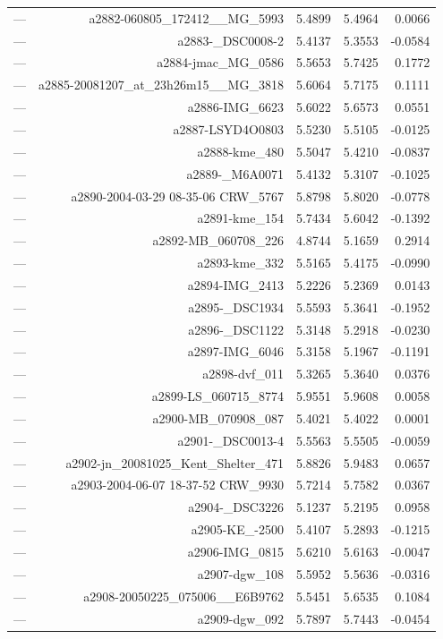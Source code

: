 \begin{table}[htbp]
\begin{tabular}{lrrrr}
— & a2882-060805_172412__MG_5993 & 5.4899 & 5.4964 & 0.0066 \\
— & a2883-_DSC0008-2 & 5.4137 & 5.3553 & -0.0584 \\
— & a2884-jmac_MG_0586 & 5.5653 & 5.7425 & 0.1772 \\
— & a2885-20081207_at_23h26m15__MG_3818 & 5.6064 & 5.7175 & 0.1111 \\
— & a2886-IMG_6623 & 5.6022 & 5.6573 & 0.0551 \\
— & a2887-LSYD4O0803 & 5.5230 & 5.5105 & -0.0125 \\
— & a2888-kme_480 & 5.5047 & 5.4210 & -0.0837 \\
— & a2889-_M6A0071 & 5.4132 & 5.3107 & -0.1025 \\
— & a2890-2004-03-29 08-35-06 CRW_5767 & 5.8798 & 5.8020 & -0.0778 \\
— & a2891-kme_154 & 5.7434 & 5.6042 & -0.1392 \\
— & a2892-MB_060708_226 & 4.8744 & 5.1659 & 0.2914 \\
— & a2893-kme_332 & 5.5165 & 5.4175 & -0.0990 \\
— & a2894-IMG_2413 & 5.2226 & 5.2369 & 0.0143 \\
— & a2895-_DSC1934 & 5.5593 & 5.3641 & -0.1952 \\
— & a2896-_DSC1122 & 5.3148 & 5.2918 & -0.0230 \\
— & a2897-IMG_6046 & 5.3158 & 5.1967 & -0.1191 \\
— & a2898-dvf_011 & 5.3265 & 5.3640 & 0.0376 \\
— & a2899-LS_060715_8774 & 5.9551 & 5.9608 & 0.0058 \\
— & a2900-MB_070908_087 & 5.4021 & 5.4022 & 0.0001 \\
— & a2901-_DSC0013-4 & 5.5563 & 5.5505 & -0.0059 \\
— & a2902-jn_20081025_Kent_Shelter_471 & 5.8826 & 5.9483 & 0.0657 \\
— & a2903-2004-06-07 18-37-52 CRW_9930 & 5.7214 & 5.7582 & 0.0367 \\
— & a2904-_DSC3226 & 5.1237 & 5.2195 & 0.0958 \\
— & a2905-KE_-2500 & 5.4107 & 5.2893 & -0.1215 \\
— & a2906-IMG_0815 & 5.6210 & 5.6163 & -0.0047 \\
— & a2907-dgw_108 & 5.5952 & 5.5636 & -0.0316 \\
— & a2908-20050225_075006__E6B9762 & 5.5451 & 5.6535 & 0.1084 \\
— & a2909-dgw_092 & 5.7897 & 5.7443 & -0.0454 \\

\end{tabular}
\end{table}
